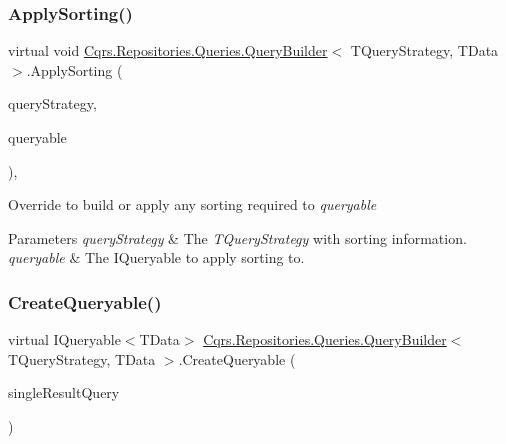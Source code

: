 \subsubsection{\texorpdfstring{Apply\+Sorting()}{ApplySorting()}}
{\footnotesize\ttfamily virtual void \hyperlink{classCqrs_1_1Repositories_1_1Queries_1_1QueryBuilder}{Cqrs.\+Repositories.\+Queries.\+Query\+Builder}$<$ T\+Query\+Strategy, T\+Data $>$.Apply\+Sorting (\begin{DoxyParamCaption}\item[{T\+Query\+Strategy}]{query\+Strategy,  }\item[{ref I\+Queryable$<$ T\+Data $>$}]{queryable }\end{DoxyParamCaption})\hspace{0.3cm}{\ttfamily [protected]}, {\ttfamily [virtual]}}



Override to build or apply any sorting required to {\itshape queryable}  


\begin{DoxyParams}{Parameters}
{\em query\+Strategy} & The {\itshape T\+Query\+Strategy}  with sorting information.\\
\hline
{\em queryable} & The I\+Queryable to apply sorting to.\\
\hline
\end{DoxyParams}
\mbox{\label{classCqrs_1_1Repositories_1_1Queries_1_1QueryBuilder_a6b103726f538e81ca0489a51b1aa3c88_a6b103726f538e81ca0489a51b1aa3c88}} 
\subsubsection{\texorpdfstring{Create\+Queryable()}{CreateQueryable()}\hspace{0.1cm}{\footnotesize\ttfamily [1/2]}}
{\footnotesize\ttfamily virtual I\+Queryable$<$T\+Data$>$ \hyperlink{classCqrs_1_1Repositories_1_1Queries_1_1QueryBuilder}{Cqrs.\+Repositories.\+Queries.\+Query\+Builder}$<$ T\+Query\+Strategy, T\+Data $>$.Create\+Queryable (\begin{DoxyParamCaption}\item[{\hyperlink{interfaceCqrs_1_1Repositories_1_1Queries_1_1ISingleResultQuery}{I\+Single\+Result\+Query}$<$ T\+Query\+Strategy, T\+Data $>$}]{single\+Result\+Query }\end{DoxyParamCaption})\hspace{0.3cm}{\ttfamily [virtual]}}



